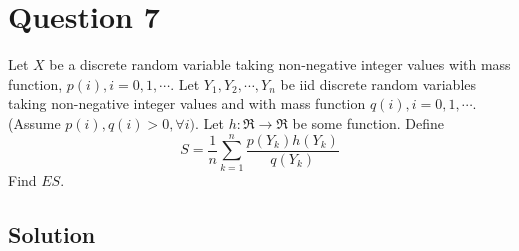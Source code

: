 \section*{Question 7}

Let \( X \) be a discrete random variable taking non-negative integer values with mass function, \( p(i), i=0,1, \cdots \).
Let \( Y_{1}, Y_{2}, \cdots, Y_{n} \) be iid discrete random variables taking non-negative integer values and with mass function \( q(i), i=0,1, \cdots \).
(Assume \( p(i), q(i)>0, \forall i) \).
Let \( h: \Re \rightarrow \Re \) be some function.
Define
\[
    S=\frac{1}{n} \sum_{k=1}^{n} \frac{p\left(Y_{k}\right) h\left(Y_{k}\right)}{q\left(Y_{k}\right)}
\]
Find \( E S \).

\subsection*{Solution}
